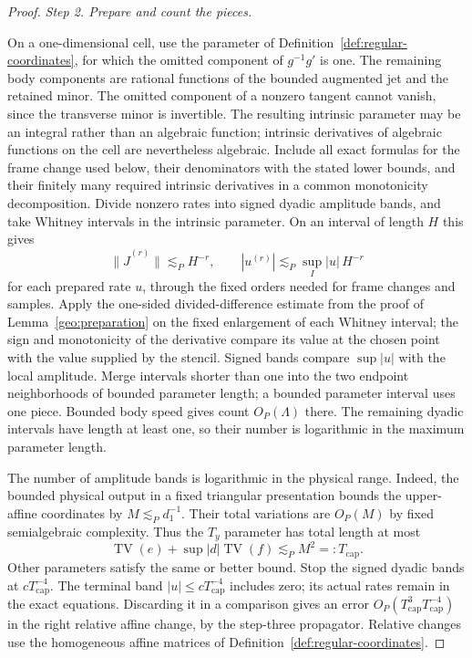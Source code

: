 \documentclass[11pt]{amsart}
\theoremstyle{definition}
\theoremstyle{remark}
\numberwithin{equation}{section}
\begin{document}
\begin{proof}
\par\medskip\noindent\textit{Step 2. Prepare and count the pieces.}\par\nobreak\smallskip

On a one-dimensional cell, use the parameter of Definition~\ref{def:regular-coordinates}, for which the omitted component of $g^{-1}g'$ is one. The remaining body components are rational functions of the bounded augmented jet and the retained minor. The omitted component of a nonzero tangent cannot vanish, since the transverse minor is invertible. The resulting intrinsic parameter may be an integral rather than an algebraic function; intrinsic derivatives of algebraic functions on the cell are nevertheless algebraic. Include all exact formulas for the frame change used below, their denominators with the stated lower bounds, and their finitely many required intrinsic derivatives in a common monotonicity decomposition. Divide nonzero rates into signed dyadic amplitude bands, and take Whitney intervals in the intrinsic parameter. On an interval of length $H$ this gives
\begin{equation}\label{reg:prepared-derivatives}
\|\widehat J^{(r)}\|\lesssim_P H^{-r},\qquad |u^{(r)}|\lesssim_P \sup_I|u|\,H^{-r}
\end{equation}
for each prepared rate $u$, through the fixed orders needed for frame changes and samples. Apply the one-sided divided-difference estimate from the proof of Lemma~\ref{geo:preparation} on the fixed enlargement of each Whitney interval; the sign and monotonicity of the derivative compare its value at the chosen point with the value supplied by the stencil. Signed bands compare $\sup|u|$ with the local amplitude. Merge intervals shorter than one into the two endpoint neighborhoods of bounded parameter length; a bounded parameter interval uses one piece. Bounded body speed gives count $O_P(\Lambda)$ there. The remaining dyadic intervals have length at least one, so their number is logarithmic in the maximum parameter length.

The number of amplitude bands is logarithmic in the physical range. Indeed, the bounded physical output in a fixed triangular presentation bounds the upper-affine coordinates by $M\lesssim_P d_1^{-1}$. Their total variations are $O_P(M)$ by fixed semialgebraic complexity. Thus the $T_y$ parameter has total length at most
\[
\operatorname{TV}(e)+\sup|d|\operatorname{TV}(f)\lesssim_P M^2=:T_{\mathrm{cap}}.
\]
Other parameters satisfy the same or better bound. Stop the signed dyadic bands at $cT_{\mathrm{cap}}^{-4}$. The terminal band $|u|\le cT_{\mathrm{cap}}^{-4}$ includes zero; its actual rates remain in the exact equations. Discarding it in a comparison gives an error $O_P(T_{\mathrm{cap}}^3T_{\mathrm{cap}}^{-4})$ in the right relative affine change, by the step-three propagator. Relative changes use the homogeneous affine matrices of Definition~\ref{def:regular-coordinates}.


\end{proof}
\end{document}
